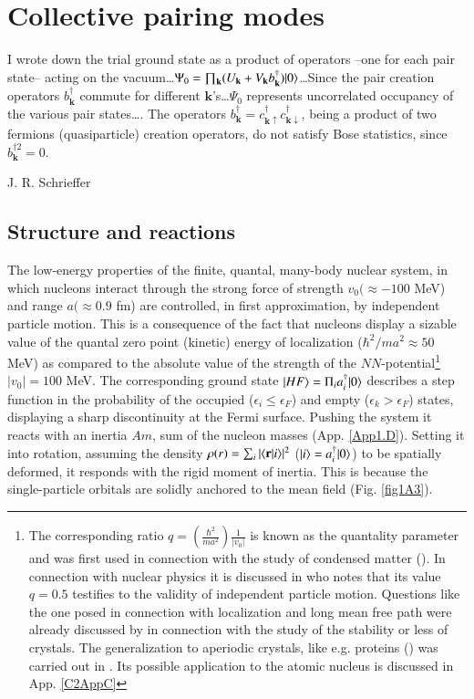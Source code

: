 \chapter{Collective pairing modes}\label{chapter1}
\epigraph{I wrote down the trial ground state as a product of operators --one for each pair state-- acting on the vacuum\dots \mbox{$\Psi_0=\prod_{\mathbf k}(U_{\mathbf k}+V_{\mathbf k}b^\dagger_{\mathbf k})|{0} \rangle$}\dots Since the pair creation operators $b^\dagger_{\mathbf k}$ commute for different $\mathbf k$'s\dots $\Psi_0$ represents uncorrelated occupancy of the various pair states\dots. The operators $b^\dagger_{\mathbf k}=c^\dagger_{\mathbf k\uparrow}c^\dagger_{\mathbf k\downarrow}$, being a product of two fermions (quasiparticle) creation operators, do not satisfy Bose statistics, since $b^{\dagger 2}_{\mathbf k}=0$.}{J. R. Schrieffer}
\section{Structure and reactions}\label{C1S1}
The low-energy properties of the finite, quantal, many-body nuclear system, in which nucleons interact through the strong force of strength $v_0(\approx -100$ MeV) and range $a(\approx 0.9$ fm) are controlled, in first approximation, by independent particle motion. This is a consequence of the fact that nucleons display a sizable value of the quantal zero point (kinetic) energy of localization ($\hbar^2/ma^2\approx 50$ MeV) as compared to the absolute value of the strength of the $NN$-potential\footnote{\label{f1C3} The corresponding ratio $q=\left(\frac{\hbar^2}{ma^2}\right)\frac{1}{|v_0|}$ 
	 is known as the quantality parameter and was first used in connection with the study of condensed matter (\cite{deBoer:48,deBoer:57,deBoer:48b,Nosanow:76}). In connection with  nuclear physics it is discussed in \cite{Mottelson:02} who notes that its value $q=0.5$ testifies to the validity of independent particle motion. Questions like the one posed in connection with localization and long mean free path were already discussed by \cite{Lindemann:10} in connection with the study of the stability or less of crystals. The generalization to aperiodic crystals, like e.g. proteins (\cite{Schrodinger:44}) was carried out in \cite{Stillinger:90}. Its possible application to the atomic nucleus is discussed in App. \ref{C2AppC} } $|v_0|=100$ MeV. 
The corresponding ground state $|{HF} \rangle=\Pi_ia^\dagger_i|{0} \rangle$ describes a step function in the probability of the occupied ($\epsilon_i\leq \epsilon_F$) and empty ($\epsilon_k>\epsilon_F$) states, displaying a sharp discontinuity at the Fermi surface. Pushing the system it reacts with an inertia $Am$, sum of the nucleon masses (App. \ref{App1.D}). Setting it into rotation, assuming the density $\rho(r)=\sum_i|\langle {\mathbf r|i} \rangle|^2$ ($|{i} \rangle=a^\dagger_i|{0} \rangle$) to be spatially deformed, it responds with the rigid moment of inertia. This is because the single-particle orbitals are solidly anchored to the mean field (Fig. \ref{fig1A3}).





